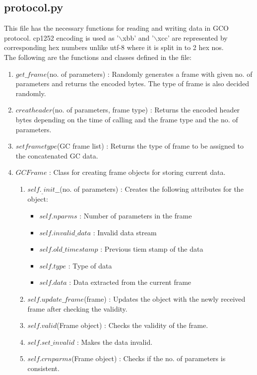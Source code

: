 \subsection{protocol.py}
This file has the necessary functions for reading and writing data in GCO
protocol. cp1252 encoding is used as '$\backslash$xbb' and '$\backslash$xcc' are represented by
corresponding hex numbers unlike utf-8 where it is split in to 2 hex nos.\\
The following are the functions and classes defined in the file:
\begin{enumerate}
	\item $get\_frame$(no. of parameters) : Randomly generates a
		frame with given no. of parameters and returns the encoded bytes.
		The type of frame is also decided randomly.
	\item $creatheader$(no. of parameters, frame type) : Returns
		the encoded header bytes depending on the time of calling and the frame
		type and the no. of parameters.
	\item $setframetype$(GC frame list) : Returns the type of frame to be
		assigned to the concatenated GC data.
	\item $GCFrame$ : Class for creating frame objects for storing current
		data.
		\begin{enumerate}
			\item $self._\_init\_\_$(no. of parameters) : Creates the following
				attributes for the object:
				\begin{itemize}
					\item $self.nparms$ : Number of parameters in the frame
					\item $self.invalid\_data$ : Invalid data stream
					\item $self.old\_timestamp$ : Previous tiem stamp of the
						data
					\item $self.type$ : Type of data
					\item $self.data$ : Data extracted from the current frame
				\end{itemize}
			\item $self.update\_frame$(frame) : Updates the object with the newly
				received frame after checking the validity.
			\item $self.valid$(Frame object) : Checks the validity of the frame.
			\item $self.set\_invalid$ : Makes the data invalid.
			\item $self.crnparms$(Frame object) : Checks if the no. of parameters
				is consistent.

\end{enumerate}
\end{enumerate}
